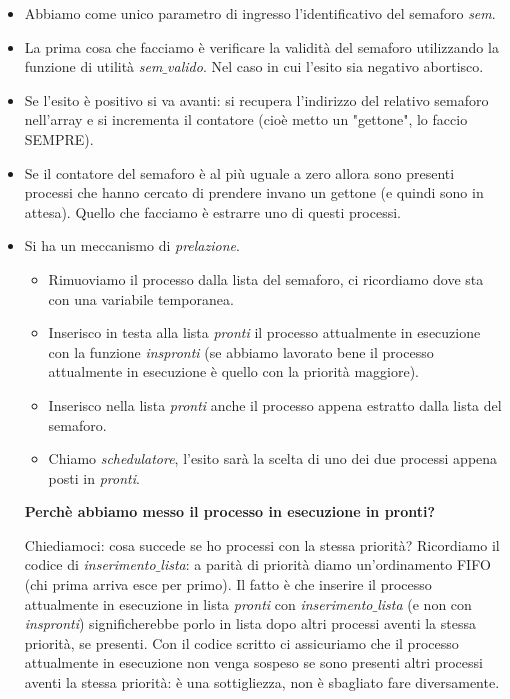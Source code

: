 \documentclass[11pt]{report}
\theoremstyle{definition}
\begin{document}
\begin{itemize}
	\item Abbiamo come unico parametro di ingresso l'identificativo del semaforo \emph{sem}.
	\item La prima cosa che facciamo è verificare la validità del semaforo utilizzando la funzione di utilità \emph{sem$\_$valido}. Nel caso in cui l'esito sia negativo abortisco.
	\item Se l'esito è positivo si va avanti: si recupera l'indirizzo del relativo semaforo nell'array e si  incrementa il contatore (cioè metto un "gettone", lo faccio SEMPRE).
	\item Se il contatore del semaforo è al più uguale a zero allora sono presenti processi che hanno cercato di prendere invano un gettone (e quindi sono in attesa). Quello che facciamo è estrarre uno di questi processi. \item Si ha un meccanismo di \emph{prelazione}.
	\begin{itemize}
		\item Rimuoviamo il processo dalla lista del semaforo, ci ricordiamo dove sta con una variabile temporanea.
		\item Inserisco in testa alla lista \textit{pronti} il processo attualmente in esecuzione con la funzione  \emph{inspronti} (se abbiamo lavorato bene il processo attualmente in esecuzione è quello con la priorità maggiore).
		\item Inserisco nella lista \textit{pronti} anche il processo appena estratto dalla lista del semaforo. 
		\item Chiamo  \textit{schedulatore}, l'esito sarà la scelta di uno dei due processi appena posti in \textit{pronti}.
	\end{itemize}
	\textbf{Perchè abbiamo messo il processo in esecuzione in pronti?} 
	
	Chiediamoci: cosa succede se ho processi con la stessa priorità? Ricordiamo il codice di \emph{inserimento$\_$lista}: a parità di priorità diamo un'ordinamento FIFO (chi prima arriva esce per primo). Il fatto è che inserire il processo attualmente in esecuzione in lista \emph{pronti} con \emph{inserimento$\_$lista} (e non con \emph{inspronti}) significherebbe porlo in lista dopo altri processi aventi la stessa priorità, se presenti. Con il codice scritto ci assicuriamo che il processo attualmente in esecuzione non venga sospeso se sono presenti altri processi aventi la stessa priorità: è una sottigliezza, non è sbagliato fare diversamente.
\end{itemize} 
\end{document}
